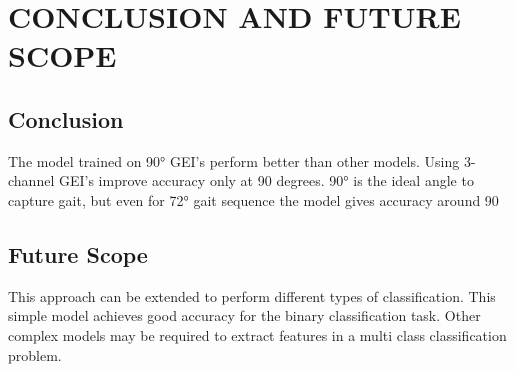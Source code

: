 \chapter{CONCLUSION AND FUTURE SCOPE}
\label{chap:conclusions}

\section{Conclusion}
The model trained on 90° GEI’s perform better than other models. Using 3-channel GEI’s improve accuracy only at 90 degrees. 90° is the ideal angle to capture gait, but even for 72° gait sequence
the model gives accuracy around 90%

\section{Future Scope}
This approach can be extended to perform different types of classification. This simple model achieves good accuracy for the binary classification task. Other complex models may be required to extract features in a multi class classification problem.